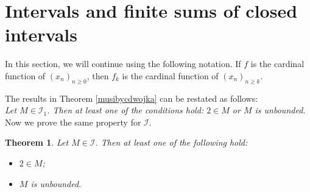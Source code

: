 \documentclass{amsart}
\newtheorem{theorem}{Theorem}[section]
\theoremstyle{definition}
\begin{document}
\section{Intervals and finite sums of closed intervals}

In this section, we will continue using the following notation. If $f$ is the cardinal function of $(x_n)_{n\geq 0}$, then $f_{k}$ is the cardinal function of $(x_n)_{n\geq k}$.

The results in Theorem \ref{musibycdwojka} can be restated as follows:
\\\emph{Let $M\in\mathcal{I}_1$. Then at least one of the conditions hold: $2\in M$ or $M$ is unbounded.}  
\\Now we prove the same property for $\mathcal{I}$. 

\begin{theorem}\label{ThmMusibycdwojka2}
Let $M\in\mathcal{I}$. Then at least one of the following hold:
\begin{itemize}
\item $2\in M$;
\item $M$ is unbounded.
\end{itemize}
\end{theorem}
\end{document}
